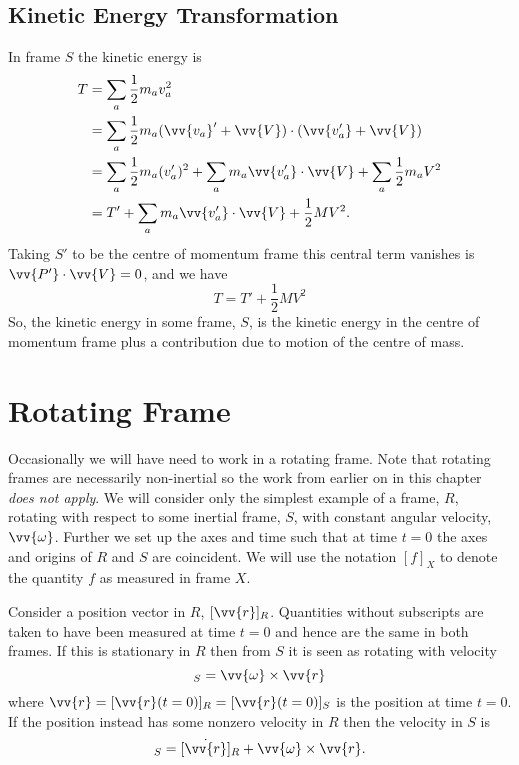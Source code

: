 \documentclass[fleqn]{NotesClass}
\begin{document}
    \subsection{Kinetic Energy Transformation}
    In frame \(S\) the kinetic energy is
    \begin{align}
        T &= \sum_a \frac{1}{2}m_av_a^2\\
        &= \sum_a \frac{1}{2}m_a(\vv{v_a}' + \vv{V})\cdot (\vv{v_a'} + \vv{V})\\
        &= \sum_a\frac{1}{2}m_a(v_a')^2 + \sum_a m_a\vv{v_a'}\cdot\vv{V} + \sum_a \frac{1}{2}m_aV^2\\
        &= T' + \sum_a m_a\vv{v_a'}\cdot\vv{V} + \frac{1}{2}MV^2.
    \end{align}
    Taking \(S'\) to be the centre of momentum frame this central term vanishes is \(\vv{P'}\cdot\vv{V} = 0\), and we have
    \begin{equation}
        T = T' + \frac{1}{2}MV^2
    \end{equation}
    So, the kinetic energy in some frame, \(S\), is the kinetic energy in the centre of momentum frame plus a contribution due to motion of the centre of mass.
    
    \section{Rotating Frame}\label{sec:rotating frame}
    Occasionally we will have need to work in a rotating frame.
    Note that rotating frames are necessarily non-inertial so the work from earlier on in this chapter \emph{does not apply}.
    We will consider only the simplest example of a frame, \(R\), rotating with respect to some inertial frame, \(S\), with constant angular velocity, \(\vv{\omega}\).
    Further we set up the axes and time such that at time \(t = 0\) the axes and origins of \(R\) and \(S\) are coincident.
    We will use the notation \([f]_X\) to denote the quantity \(f\) as measured in frame \(X\).
    
    Consider a position vector in \(R\), \([\vv{r}]_{R}\).
    Quantities without subscripts are taken to have been measured at time \(t = 0\) and hence are the same in both frames.
    If this is stationary in \(R\) then from \(S\) it is seen as rotating with velocity
    \begin{equation}
        [\vv{v}]_S = \vv{\omega} \times \vv{r}
    \end{equation}
    where \(\vv{r} = [\vv{r}(t = 0)]_R = [\vv{r}(t = 0)]_S\) is the position at time \(t = 0\).
    If the position instead has some nonzero velocity in \(R\) then the velocity in \(S\) is
    \begin{equation}
        [\dot{\vv{r}}]_S = [\dot{\vv{r}}]_R + \vv{\omega}\times\vv{r}.
    \end{equation}
    
\end{document}
